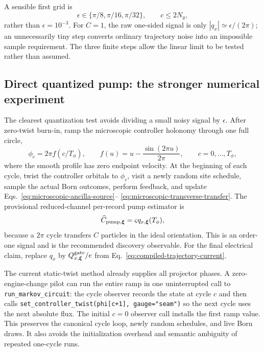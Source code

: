 \documentclass[aps,prb,onecolumn,nofootinbib,superscriptaddress]{revtex4-2}
\newcommand{\bxi}{\bm{\xi}}
\newcommand{\code}[1]{\texttt{#1}}
\begin{document}
A sensible first grid is
\begin{equation}
  \epsilon\in\{\pi/8,\pi/16,\pi/32\},
  \qquad c\le 2N_y,
  \label{eq:step-pilot-grid}
\end{equation}
rather than $\epsilon=10^{-3}$.  For $C=1$, the raw one-sided signal is only
$|q_x|\simeq\epsilon/(2\pi)$; an unnecessarily tiny step converts ordinary
trajectory noise into an impossible sample requirement.  The three finite
steps allow the linear limit to be tested rather than assumed.

\subsection{Direct quantized pump: the stronger numerical experiment}

The clearest quantization test avoids dividing a small noisy signal by
$\epsilon$.  After zero-twist burn-in, ramp the microscopic controller
holonomy through one full circle,
\begin{equation}
  \phi_c=2\pi f(c/T_\phi),
  \qquad
  f(u)=u-\frac{\sin(2\pi u)}{2\pi},
  \qquad c=0,\ldots,T_\phi,
  \label{eq:smooth-flux-ramp}
\end{equation}
where the smooth profile has zero endpoint velocity.  At the beginning of
each cycle, twist the controller orbitals to $\phi_c$, visit a newly random
site schedule, sample the actual Born outcomes, perform feedback, and update
Eqs.~\eqref{eq:microscopic-ancilla-source}--
\eqref{eq:microscopic-transverse-transfer}.  The provisional reduced-channel
per-record pump estimator is
\begin{equation}
  \widehat C_{{\rm pump},\bxi}
  =\varsigma q_{x,\bxi}(T_\phi),
  \label{eq:microscopic-pump-estimator}
\end{equation}
because a $2\pi$ cycle transfers $C$ particles in the ideal orientation.
This is an order-one signal and is the recommended discovery observable.  For
the final electrical claim, replace $q_x$ by
$Q^{\rm gate}_{x,\bxi}/e$ from
Eq.~\eqref{eq:compiled-trajectory-current}.

The current static-twist method already supplies all projector phases.  A
zero-engine-change pilot can run the entire ramp in one uninterrupted call to
\code{run\_markov\_circuit}: the cycle observer records the state at cycle
$c$ and then calls
\code{set\_controller\_twist(phi[c+1], gauge="seam")} so the next cycle uses
the next absolute flux.  The initial $c=0$ observer call installs the first
ramp value.  This preserves the canonical cycle loop, newly random schedules,
and live Born draws.  It also avoids the initialization overhead and semantic
ambiguity of repeated one-cycle runs.
\end{document}
